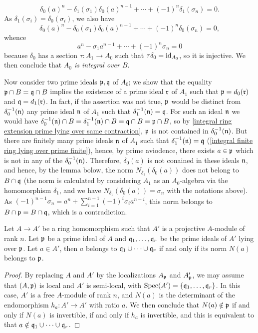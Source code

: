 \[\delta_0(a)^n-\delta_1(\sigma_1)\delta_0(a)^{n-1}+\cdots+(-1)^{n}\delta_1(\sigma_n)=0.\]
As $\delta_1(\sigma_i)=\delta_0(\sigma_i)$, we also have
\[\delta_0(a)^n-\delta_0(\sigma_1)\delta_0(a)^{n-1}+\cdots+(-1)^{n}\delta_0(\sigma_n)=0,\]
whence
\[a^n-\sigma_1a^{n-1}+\cdots+(-1)^{n}\sigma_n=0\]
because $\delta_0$ has a section $\tau:A_1\to A_0$ such that $\tau\delta_0=\operatorname{id}_{A_0}$, so it is injective. We then conclude that \textit{$A_0$ is integral over $B$}.\par
Now consider two prime ideals $\mathfrak{p},\mathfrak{q}$ of $A_0$; we show that the equality $\mathfrak{p}\cap B=\mathfrak{q}\cap B$ implies the existence of a prime ideal $\mathfrak{r}$ of $A_1$ such that $\mathfrak{p}=d_0(\mathfrak{r})$ and $\mathfrak{q}=d_1(\mathfrak{r})$. In fact, if the assertion was not true, $\mathfrak{p}$ would be distinct from $\delta_0^{-1}(\mathfrak{n})$ any prime ideal $\mathfrak{n}$ of $A_1$ such that $\delta_1^{-1}(\mathfrak{n})=\mathfrak{q}$. For such an ideal $\mathfrak{n}$ we would have $\delta_0^{-1}(\mathfrak{n})\cap B=\delta_1^{-1}(\mathfrak{n})\cap B=\mathfrak{q}\cap B=\mathfrak{p}\cap B$, so by \cref{integral ring extension prime lying over same contraction}, $\mathfrak{p}$ is not contained in $\delta_0^{-1}(\mathfrak{n})$. But there are finitely many prime ideals $\mathfrak{n}$ of $A_1$ such that $\delta_1^{-1}(\mathfrak{n})=\mathfrak{q}$ (\cref{integral finite ring lying over prime finite}), hence, by prime aviodence, there exists $a\in\mathfrak{p}$ which is not in any of the $\delta_0^{-1}(\mathfrak{n})$. Therefore, $\delta_0(a)$ is not conained in these ideals $\mathfrak{n}$, and hence, by the lemma bolow, the norm $N_{\delta_1}(\delta_0(a))$ does not belong to $B\cap\mathfrak{q}$ (the norm is calculated by considering $A_1$ as an $A_0$-algebra via the homomorphism $\delta_1$, and we have $N_{\delta_1}(\delta_0(a))=\sigma_n$ with the notations above). As $(-1)^{n-1}\sigma_n=a^n+\sum_{i=1}^{n-1}(-1)^i\sigma_ia^{n-i}$, this norm belongs to $B\cap\mathfrak{p}=B\cap\mathfrak{q}$, which is a contradiction.

\begin{lemma}\label{ring homomorphism lying over prime iff norm belong to p}
Let $A\to A'$ be a ring homomorphism such that $A'$ is a projective $A$-module of rank $n$. Let $\mathfrak{p}$ be a prime ideal of $A$ and $\mathfrak{q}_1,\dots,\mathfrak{q}_r$ be the prime ideals of $A'$ lying over $\mathfrak{p}$. Let $a\in A'$, then $a$ belongs to $\mathfrak{q}_1\cup\cdots\cup\mathfrak{q}_r$ if and only if its norm $N(a)$ belongs to $\mathfrak{p}$.
\end{lemma}
\begin{proof}
By replacing $A$ and $A'$ by the localizations $A_{\mathfrak{p}}$ and $A'_{\mathfrak{p}}$, we may assume that $(A,\mathfrak{p})$ is local and $A'$ is semi-local, with $\mathrm{Spec}(A')=\{\mathfrak{q}_1,\dots,\mathfrak{q}_r\}$. In this case, $A'$ is a free $A$-module of rank $n$, and $N(a)$ is the determinant of the endomorphism $h_a:A'\to A'$ with ratio $a$. We then conclude that $N(a)\notin\mathfrak{p}$ if and only if $N(a)$ is invertible, if and only if $h_a$ is invertible, and this is equivalent to that $a\notin\mathfrak{q}_1\cup\cdots\cup\mathfrak{q}_r$. 
\end{proof}

